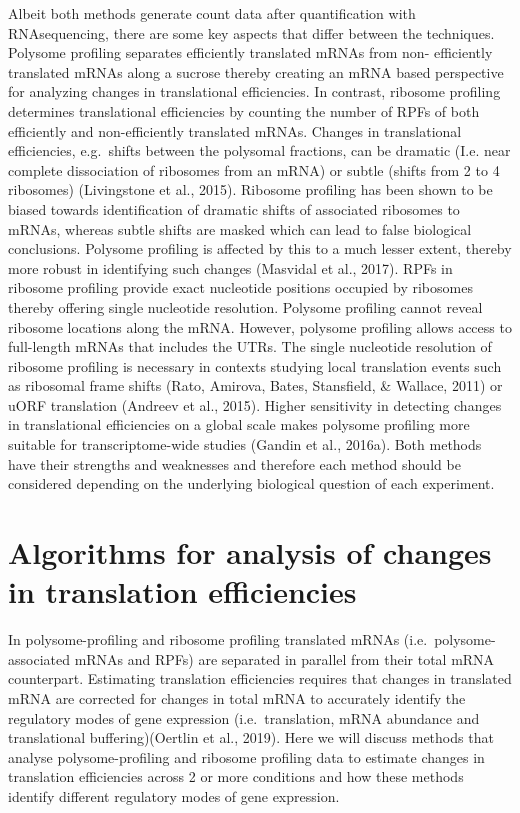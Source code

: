 \documentclass[12pt,openany]{book}
\begin{document}
Albeit both methods generate count data after quantification with
RNAsequencing, there are some key aspects that differ between the
techniques. Polysome profiling separates efficiently translated mRNAs
from non- efficiently translated mRNAs along a sucrose thereby creating
an mRNA based perspective for analyzing changes in translational
efficiencies. In contrast, ribosome profiling determines translational
efficiencies by counting the number of RPFs of both efficiently and
non-efficiently translated mRNAs. Changes in translational efficiencies,
e.g.~shifts between the polysomal fractions, can be dramatic (I.e. near
complete dissociation of ribosomes from an mRNA) or subtle (shifts from
2 to 4 ribosomes) (Livingstone et al., 2015). Ribosome profiling has
been shown to be biased towards identification of dramatic shifts of
associated ribosomes to mRNAs, whereas subtle shifts are masked which
can lead to false biological conclusions. Polysome profiling is affected
by this to a much lesser extent, thereby more robust in identifying such
changes (Masvidal et al., 2017). RPFs in ribosome profiling provide
exact nucleotide positions occupied by ribosomes thereby offering single
nucleotide resolution. Polysome profiling cannot reveal ribosome
locations along the mRNA. However, polysome profiling allows access to
full-length mRNAs that includes the UTRs. The single nucleotide
resolution of ribosome profiling is necessary in contexts studying local
translation events such as ribosomal frame shifts (Rato, Amirova, Bates,
Stansfield, \& Wallace, 2011) or uORF translation (Andreev et al.,
2015). Higher sensitivity in detecting changes in translational
efficiencies on a global scale makes polysome profiling more suitable
for transcriptome-wide studies (Gandin et al., 2016a). Both methods have
their strengths and weaknesses and therefore each method should be
considered depending on the underlying biological question of each
experiment.

\section{Algorithms for analysis of changes in translation efficiencies}

In polysome-profiling and ribosome profiling translated mRNAs
(i.e.~polysome-associated mRNAs and RPFs) are separated in parallel from
their total mRNA counterpart. Estimating translation efficiencies
requires that changes in translated mRNA are corrected for changes in
total mRNA to accurately identify the regulatory modes of gene
expression (i.e.~translation, mRNA abundance and translational
buffering)(Oertlin et al., 2019). Here we will discuss methods that
analyse polysome-profiling and ribosome profiling data to estimate
changes in translation efficiencies across 2 or more conditions and how
these methods identify different regulatory modes of gene expression.
\end{document}
